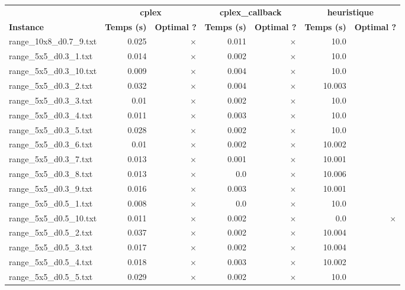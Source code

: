 \documentclass{article}
\begin{document}
\newpage
\begin{center}
\renewcommand{\arraystretch}{1.4} 
 \begin{tabular}{lrrrrrr}
	\hline
 & \multicolumn{2}{c}{\textbf{cplex}} & \multicolumn{2}{c}{\textbf{cplex_callback}} & \multicolumn{2}{c}{\textbf{heuristique}}\\
\textbf{Instance}  & \textbf{Temps (s)} & \textbf{Optimal ?}  & \textbf{Temps (s)} & \textbf{Optimal ?}  & \textbf{Temps (s)} & \textbf{Optimal ?} \\\hline

range\_10x8\_d0.7\_9.txt & 0.025 & 
$\times$
 & 0.011 & 
$\times$
 & 10.0 & 
\\
range\_5x5\_d0.3\_1.txt & 0.014 & 
$\times$
 & 0.002 & 
$\times$
 & 10.0 & 
\\
range\_5x5\_d0.3\_10.txt & 0.009 & 
$\times$
 & 0.004 & 
$\times$
 & 10.0 & 
\\
range\_5x5\_d0.3\_2.txt & 0.032 & 
$\times$
 & 0.004 & 
$\times$
 & 10.003 & 
\\
range\_5x5\_d0.3\_3.txt & 0.01 & 
$\times$
 & 0.002 & 
$\times$
 & 10.0 & 
\\
range\_5x5\_d0.3\_4.txt & 0.011 & 
$\times$
 & 0.003 & 
$\times$
 & 10.0 & 
\\
range\_5x5\_d0.3\_5.txt & 0.028 & 
$\times$
 & 0.002 & 
$\times$
 & 10.0 & 
\\
range\_5x5\_d0.3\_6.txt & 0.01 & 
$\times$
 & 0.002 & 
$\times$
 & 10.002 & 
\\
range\_5x5\_d0.3\_7.txt & 0.013 & 
$\times$
 & 0.001 & 
$\times$
 & 10.001 & 
\\
range\_5x5\_d0.3\_8.txt & 0.013 & 
$\times$
 & 0.0 & 
$\times$
 & 10.006 & 
\\
range\_5x5\_d0.3\_9.txt & 0.016 & 
$\times$
 & 0.003 & 
$\times$
 & 10.001 & 
\\
range\_5x5\_d0.5\_1.txt & 0.008 & 
$\times$
 & 0.0 & 
$\times$
 & 10.0 & 
\\
range\_5x5\_d0.5\_10.txt & 0.011 & 
$\times$
 & 0.002 & 
$\times$
 & 0.0 & 
$\times$
\\
range\_5x5\_d0.5\_2.txt & 0.037 & 
$\times$
 & 0.002 & 
$\times$
 & 10.004 & 
\\
range\_5x5\_d0.5\_3.txt & 0.017 & 
$\times$
 & 0.002 & 
$\times$
 & 10.004 & 
\\
range\_5x5\_d0.5\_4.txt & 0.018 & 
$\times$
 & 0.003 & 
$\times$
 & 10.002 & 
\\
range\_5x5\_d0.5\_5.txt & 0.029 & 
$\times$
 & 0.002 & 
$\times$
 & 10.0 & 
\\

\end{tabular}
\end{center}
\end{document}
